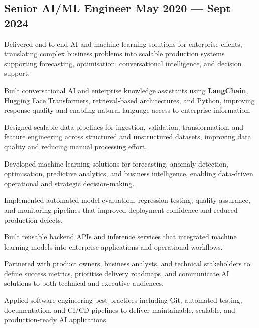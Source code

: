 \subsection{{Senior AI/ML Engineer \hfill May 2020 --- Sept 2024}}
\begin{zitemize}

\item Delivered end-to-end AI and machine learning solutions for enterprise clients, translating complex business problems into scalable production systems supporting forecasting, optimisation, conversational intelligence, and decision support.

\item Built conversational AI and enterprise knowledge assistants using \textbf{LangChain}, Hugging Face Transformers, retrieval-based architectures, and Python, improving response quality and enabling natural-language access to enterprise information.

\item Designed scalable data pipelines for ingestion, validation, transformation, and feature engineering across structured and unstructured datasets, improving data quality and reducing manual processing effort.

\item Developed machine learning solutions for forecasting, anomaly detection, optimisation, predictive analytics, and business intelligence, enabling data-driven operational and strategic decision-making.

\item Implemented automated model evaluation, regression testing, quality assurance, and monitoring pipelines that improved deployment confidence and reduced production defects.

\item Built reusable backend APIs and inference services that integrated machine learning models into enterprise applications and operational workflows.

\item Partnered with product owners, business analysts, and technical stakeholders to define success metrics, prioritise delivery roadmaps, and communicate AI solutions to both technical and executive audiences.

\item Applied software engineering best practices including Git, automated testing, documentation, and CI/CD pipelines to deliver maintainable, scalable, and production-ready AI applications.

\end{zitemize}


